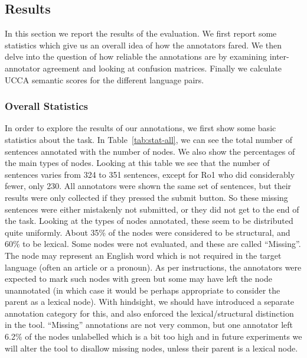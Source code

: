 \documentclass[11pt]{article}
\begin{document}
\newpage



\subsection{Results}


In this section we report the results of the evaluation. We first report some statistics which give us an overall idea
of how the annotators fared. We then delve into the question of how reliable the annotations are by examining
inter-annotator agreement and looking at confusion matrices. Finally we calculate UCCA semantic scores
for the different language pairs.  

\subsubsection{Overall Statistics}

In order to explore the results of our annotations, we first show some basic statistics
about the task. In Table~\ref{tab:stat-all}, we can see the total number of sentences annotated
%
with
the number of nodes. We also show the percentages of the main types of nodes.
Looking at this table we see that the number of sentences varies from 324 to 351 sentences,
except for Ro1 who did considerably fewer, only 230. 
All annotators were shown the same set of sentences, but their results were only
collected if they pressed the submit button. So these missing sentences were either mistakenly
not submitted, or they did not get to the end of the task. 
Looking at the types of nodes annotated, these seem to be distributed quite uniformly.
About 35\% of the nodes were considered to be structural, and 60\% to be lexical.
Some nodes were not evaluated, and these are called ``Missing''. 
The node may represent an English
word which is not required in the target language (often an article or a
pronoun).
As per instructions, the annotators were expected to mark such nodes with green
but some may have left the node unannotated (in which case it would be perhaps
appropriate to consider the parent as a lexical node).
With hindsight, we should have introduced a separate annotation category for this, and
also enforced the lexical/structural distinction in the tool. ``Missing''
annotations are not very common, but
one annotator left 6.2\% of the nodes unlabelled which is a bit too high and in 
future experiments we will alter the tool to disallow missing nodes, unless their parent is a lexical node. 
\end{document}
